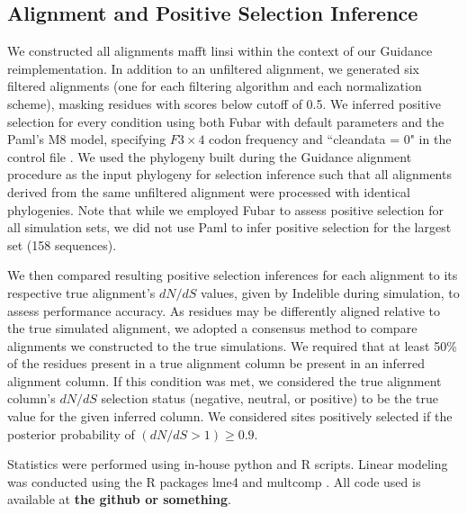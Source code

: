 \documentclass[10pt]{article}
\begin{document}
\subsection*{Alignment and Positive Selection Inference}
We constructed all alignments mafft linsi \citep{Katoh2002,Katoh2005} within the context of our Guidance reimplementation. In addition to an unfiltered alignment, we generated six filtered alignments (one for each filtering algorithm and each normalization scheme), masking residues with scores below cutoff of 0.5. We inferred positive selection for every condition using both Fubar \citep{Murrell2013} with default parameters and the Paml's M8 model, specifying $F3\times4$ codon frequency and ``cleandata = 0" in the control file \citep{Yang2007}. We used the phylogeny built during the Guidance alignment procedure as the input phylogeny for selection inference such that all alignments derived from the same unfiltered alignment were processed with identical phylogenies. Note that while we employed Fubar to assess positive selection for all simulation sets, we did not use Paml to infer positive selection for the largest set (158 sequences).

We then compared resulting positive selection inferences for each alignment to its respective true alignment's $dN/dS$ values, given by Indelible during simulation, to assess performance accuracy. As residues may be differently aligned relative to the true simulated alignment, we adopted a consensus method to compare alignments we constructed to the true simulations. We required that at least 50\% of the residues present in a true alignment column be present in an inferred alignment column. If this condition was met, we considered the true alignment column’s $dN/dS$  selection status (negative, neutral, or positive) to be the true value for the given inferred column. We considered sites positively selected if the posterior probability of $(dN/dS>1) \geq 0.9$.

Statistics were performed using in-house python and R scripts. Linear modeling was conducted using the R packages lme4 \citep{Bates2012} and
multcomp \citep{Hothorn2008}. All code used is available at \textbf{the github or something}.
\end{document}
